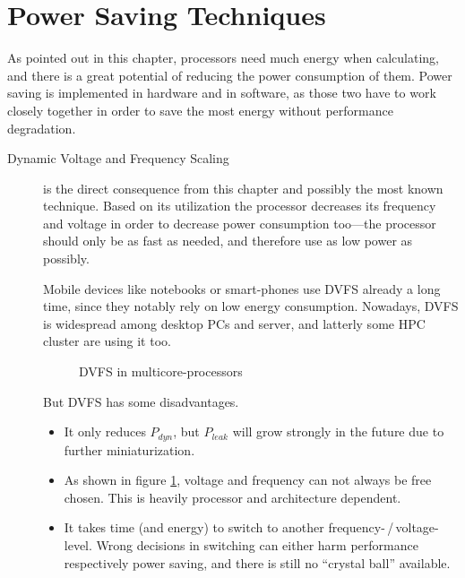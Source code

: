 %
%
\section{Power Saving Techniques}
As pointed out in this chapter, processors need much energy when calculating, and there is a great potential of reducing the power consumption of them. Power saving is implemented in hardware and in software, as those two have to work closely together in order to save the most energy without performance degradation.

%
\begin{description}
\item[Dynamic Voltage and Frequency Scaling] is the direct consequence from this chapter and possibly the most known technique. Based on its utilization the processor decreases its frequency and voltage in order to decrease power consumption too---the processor should only be as fast as needed, and therefore use as low power as possibly.\label{item:dvfs}

Mobile devices like notebooks or smart-phones use DVFS already a long time, since they notably rely on low energy consumption. Nowadays, DVFS is widespread among desktop PCs and server, and latterly some HPC cluster are using it too.

%
\begin{figure}[hbt]
	\centering
	\newcommand*\Captiontext{DVFS in multicore-processors}
	\hfill %
	\hfill %
	\caption[\Captiontext]{\Captiontext}
	\label{fig:dvfs}
\end{figure}
%

But DVFS has some disadvantages. 
\begin{itemize}
\item It only reduces $P_{dyn}$, but $P_{leak}$ will grow strongly in the future\cite{temp} due to further miniaturization.
\item As shown in figure \ref{fig:dvfs}, voltage and frequency can not always be free chosen. This is heavily processor and architecture dependent.
\item It takes time (and energy) to switch to another frequency-\,/\,voltage-level. Wrong decisions in switching can either harm performance respectively power saving, and there is still no ``crystal ball'' available.
\end{itemize}


\end{description}
